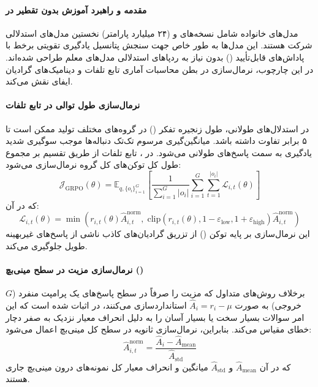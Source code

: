 \item {}

\paragraph*{مقدمه و راهبرد آموزش بدون تقطیر در }
مدل‌های خانواده  \cite{mistral2025magistral} شامل نسخه‌های  و  (۲۴ میلیارد پارامتر) نخستین مدل‌های استدلالی شرکت  هستند. این مدل‌ها به طور خاص جهت سنجش پتانسیل یادگیری تقویتی برخط با پاداش‌های قابل‌تأیید () بدون نیاز به ردپاهای استدلالی مدل‌های معلم طراحی شده‌اند. در این چارچوب، نرمال‌سازی در بطن محاسبات آماری تابع تلفات و دینامیک‌های گرادیان ایفای نقش می‌کند.

\paragraph*{نرمال‌سازی طول توالی در تابع تلفات }
در استدلال‌های طولانی، طول زنجیره تفکر () در گروه‌های مختلف تولید ممکن است تا ۵ برابر تفاوت داشته باشد. میانگین‌گیری مرسوم تک‌تک دنباله‌ها موجب سوگیری شدید یادگیری به سمت پاسخ‌های طولانی می‌شود. در ، تابع تلفات از طریق تقسیم بر مجموع طول کل توکن‌های کل گروه نرمال‌سازی می‌شود:
\begin{equation}
    \mathcal{J}_{\text{GRPO}}(\theta) = \mathbb{E}_{q, \{o_i\}_{i=1}^G} \left[ \frac{1}{\sum_{i=1}^G |o_i|} \sum_{i=1}^G \sum_{t=1}^{|o_i|} \mathcal{L}_{i,t}(\theta) \right]
\end{equation}
که در آن:
\begin{equation}
    \mathcal{L}_{i,t}(\theta) = \min\left( r_{i,t}(\theta) \hat{A}_{i,t}^{\text{norm}}, \; \text{clip}(r_{i,t}(\theta), 1-\varepsilon_{\text{low}}, 1+\varepsilon_{\text{high}}) \hat{A}_{i,t}^{\text{norm}} \right)
\end{equation}
این نرمال‌سازی بر پایه توکن () از تزریق گرادیان‌های کاذب ناشی از پاسخ‌های غیربهینه طویل جلوگیری می‌کند.

\paragraph*{نرمال‌سازی مزیت در سطح مینی‌بچ ()}
برخلاف روش‌های متداول که مزیت را صرفاً در سطح پاسخ‌های یک پرامپت منفرد ($G$ خروجی) به صورت $\hat{A}_i = r_i - \mu$ استانداردسازی می‌کنند، در  اثبات شده است که این امر سوالات بسیار سخت یا بسیار آسان را به دلیل انحراف معیار نزدیک به صفر دچار خطای مقیاس می‌کند. بنابراین، نرمال‌سازی ثانویه در سطح کل مینی‌بچ اعمال می‌شود:
\begin{equation}
    \hat{A}_{i,t}^{\text{norm}} = \frac{\hat{A}_i - \hat{A}_{\text{mean}}}{\hat{A}_{\text{std}}}
\end{equation}
که در آن $\hat{A}_{\text{mean}}$ و $\hat{A}_{\text{std}}$ میانگین و انحراف معیار کل نمونه‌های درون مینی‌بچ جاری هستند.

